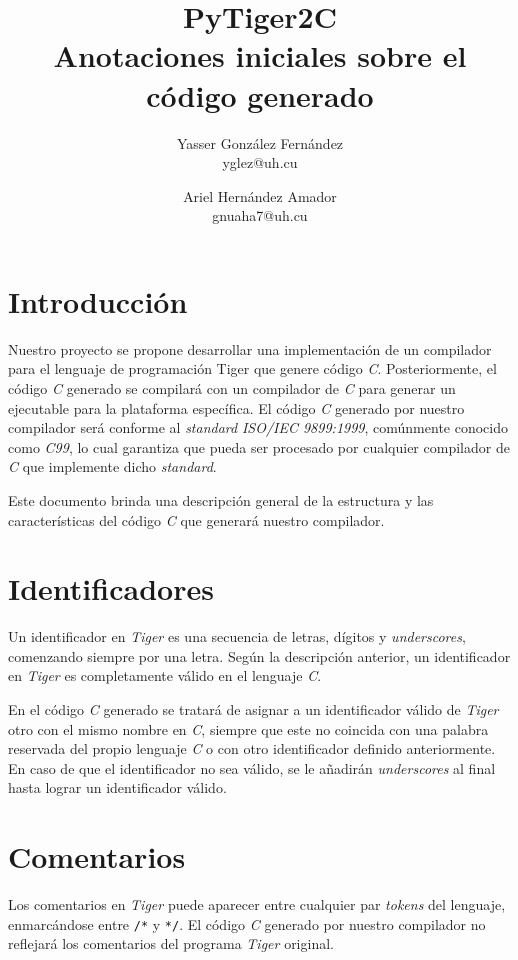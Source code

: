 \documentclass{article}
\title{
    \LARGE{PyTiger2C} \\
    \Large{Anotaciones iniciales sobre el código generado}
}
\author{
    Yasser González Fernández \\
    \small{yglez@uh.cu}
    \and
    Ariel Hernández Amador \\
    \small{gnuaha7@uh.cu}
}
\date{}
\begin{document}
\maketitle

\thispagestyle{empty}

\newpage

\setcounter{page}{1}

\section{Introducción}

Nuestro proyecto se propone desarrollar una implementación de un compilador para
el lenguaje de programación Tiger que genere código \emph{C}. Posteriormente, el
código \emph{C} generado se compilará con un compilador de \emph{C} para generar
un ejecutable para la plataforma específica. El código \emph{C} generado por
nuestro compilador será conforme al \emph{standard} \emph{ISO/IEC 9899:1999},
comúnmente conocido como \emph{C99}, lo cual garantiza que pueda ser procesado
por cualquier compilador de \emph{C} que implemente dicho \emph{standard}.

Este documento brinda una descripción general de la estructura y las
características del código \emph{C} que generará nuestro compilador.

\section{Identificadores}

Un identificador en \textit{Tiger} es una secuencia de letras, dígitos y
\textit{underscores}, comenzando siempre por una letra. Según la descripción
anterior, un identificador en \textit{Tiger} es completamente válido en el
lenguaje \textit{C}.

En el código \textit{C} generado se tratará de asignar a un identificador
válido de \textit{Tiger} otro con el mismo nombre en \textit{C}, siempre que
este no coincida con una palabra reservada del propio lenguaje \textit{C} o con
otro identificador definido anteriormente. En caso de que el identificador no
sea válido, se le añadirán \textit{underscores} al final hasta lograr un 
identificador válido.

\section{Comentarios}

Los comentarios en \textit{Tiger} puede aparecer entre cualquier par
\textit{tokens} del lenguaje, enmarcándose entre \texttt{/*} y \texttt{*/}. El
código \textit{C} generado por nuestro compilador no reflejará los comentarios
del programa \textit{Tiger} original.
\end{document}
